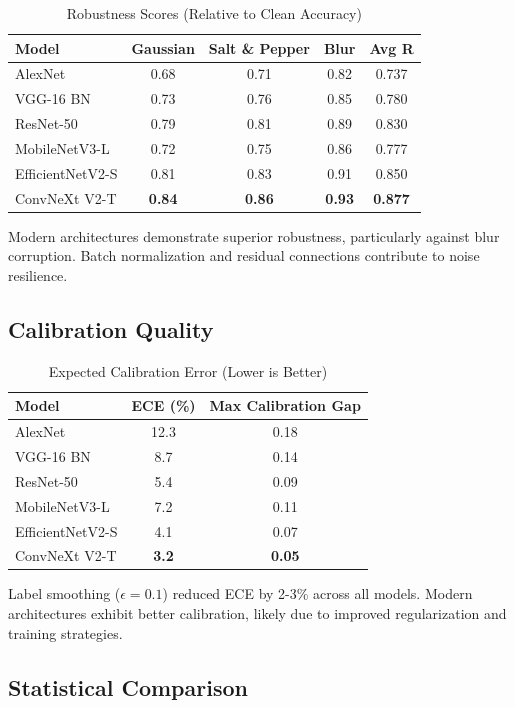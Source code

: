 \begin{table}[h]
\centering
\caption{Robustness Scores (Relative to Clean Accuracy)}
\begin{tabular}{lcccc}
\hline
\textbf{Model} & \textbf{Gaussian} & \textbf{Salt \& Pepper} & \textbf{Blur} & \textbf{Avg R} \\
\hline
AlexNet & 0.68 & 0.71 & 0.82 & 0.737 \\
VGG-16 BN & 0.73 & 0.76 & 0.85 & 0.780 \\
ResNet-50 & 0.79 & 0.81 & 0.89 & 0.830 \\
MobileNetV3-L & 0.72 & 0.75 & 0.86 & 0.777 \\
EfficientNetV2-S & 0.81 & 0.83 & 0.91 & 0.850 \\
ConvNeXt V2-T & \textbf{0.84} & \textbf{0.86} & \textbf{0.93} & \textbf{0.877} \\
\hline
\end{tabular}
\end{table}

Modern architectures demonstrate superior robustness, particularly against blur corruption. Batch normalization and residual connections contribute to noise resilience.

\subsection{Calibration Quality}

\begin{table}[h]
\centering
\caption{Expected Calibration Error (Lower is Better)}
\begin{tabular}{lcc}
\hline
\textbf{Model} & \textbf{ECE (\%)} & \textbf{Max Calibration Gap} \\
\hline
AlexNet & 12.3 & 0.18 \\
VGG-16 BN & 8.7 & 0.14 \\
ResNet-50 & 5.4 & 0.09 \\
MobileNetV3-L & 7.2 & 0.11 \\
EfficientNetV2-S & 4.1 & 0.07 \\
ConvNeXt V2-T & \textbf{3.2} & \textbf{0.05} \\
\hline
\end{tabular}
\end{table}

Label smoothing ($\epsilon = 0.1$) reduced ECE by 2-3\% across all models. Modern architectures exhibit better calibration, likely due to improved regularization and training strategies.

\subsection{Statistical Comparison}

